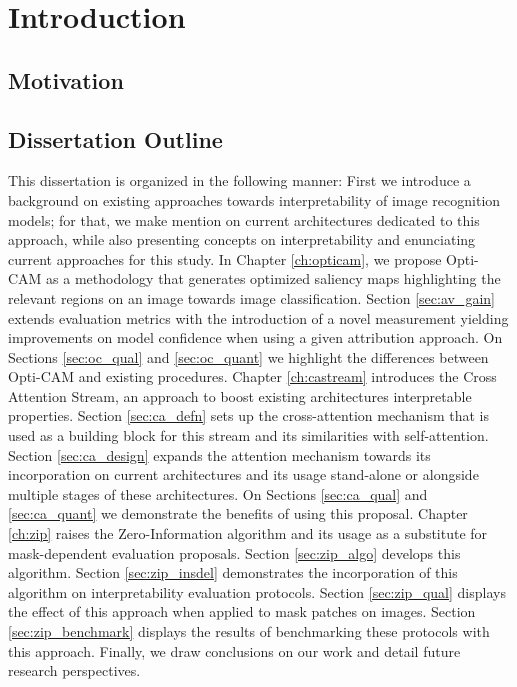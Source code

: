     \chapter*{Introduction}

    \section*{Motivation}

    \section*{Dissertation Outline}
    This dissertation is organized in the following manner: First
    we introduce a background on existing approaches towards interpretability of image
    recognition models; for that, we make mention on current architectures dedicated 
    to this approach, while also presenting concepts on interpretability and enunciating 
    current approaches for this study. 
    In Chapter \ref{ch:opticam}, we propose Opti-CAM as a methodology that generates 
    optimized saliency maps highlighting the relevant regions on an image towards image
    classification. Section \ref{sec:av_gain} extends evaluation metrics with the 
    introduction of a novel measurement yielding improvements on model confidence 
    when using a given attribution approach. 
    On Sections \ref{sec:oc_qual} and \ref{sec:oc_quant} we highlight the differences 
    between Opti-CAM and existing procedures. Chapter \ref{ch:castream} introduces 
    the Cross Attention Stream, an approach to boost existing architectures
    interpretable properties. Section \ref{sec:ca_defn} sets up the cross-attention 
    mechanism that is used as a building block for this stream and its similarities with
    self-attention.  Section \ref{sec:ca_design} expands the attention mechanism 
    towards its incorporation on current architectures and its usage stand-alone or alongside
    multiple stages of these architectures. On Sections \ref{sec:ca_qual} and \ref{sec:ca_quant}
    we demonstrate the benefits of using this proposal.
    Chapter \ref{ch:zip} raises the Zero-Information algorithm and its usage as a substitute
    for mask-dependent evaluation proposals. Section \ref{sec:zip_algo} develops this 
    algorithm. Section \ref{sec:zip_insdel} demonstrates the incorporation of this 
    algorithm on interpretability evaluation protocols. Section \ref{sec:zip_qual} displays
    the effect of this approach when applied to mask patches on images. Section \ref{sec:zip_benchmark} 
    displays the results of benchmarking these protocols with this approach. Finally, 
    we draw conclusions on our work and detail future research perspectives.

